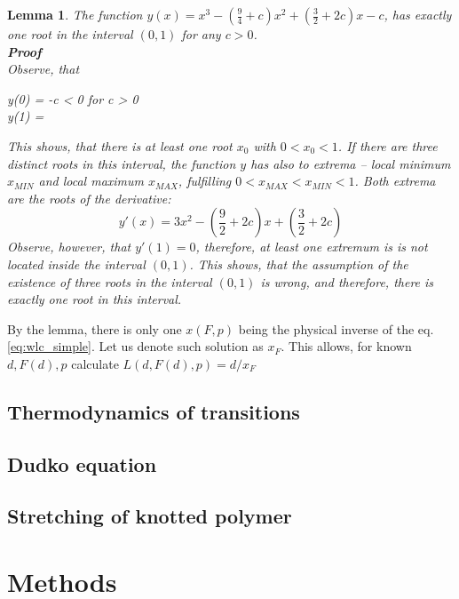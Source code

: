 \documentclass[11pt]{article}
\newtheorem{lemma}[theorem]{Lemma}
\begin{document}
\begin{lemma}
    The function $y(x) = x^3 - (\frac{9}{4}+c) x^2 + (\frac{3}{2}+2c) x - c$, has exactly one root in the interval $(0,1)$ for any $c \gt 0$.
    \\\textbf{Proof}\\
    Observe, that
    \begin{multiline}
        y(0) = -c < 0 for c > 0\\
        y(1) = 
    \end{multiline}
    This shows, that there is at least one root $x_0$ with $0 \lt x_0 \lt 1$.
    If there are three distinct roots in this interval, the function $y$ has also to extrema -- local minimum $x_{MIN}$ and local maximum $x_{MAX}$, fulfilling $0 \lt x_{MAX} \lt x_{MIN} \lt 1$.
    Both extrema are the roots of the derivative:
    \begin{equation}
        y'(x) = 3x^2 - (\frac{9}{2}+2c)x + (\frac{3}{2}+2c)
    \end{equation}
    Observe, however, that $y'(1)=0$, therefore, at least one extremum is is not located inside the interval $(0,1)$.
    This shows, that the assumption of the existence of three roots in the interval $(0,1)$ is wrong, and therefore, there is exactly one root in this interval.
\end{lemma}

By the lemma, there is only one $x(F,p)$ being the physical inverse of the eq.\ref{eq:wlc_simple}.
Let us denote such solution as $x_F$.
This allows, for known $d,F(d),p$ calculate $L(d,F(d),p)=d/x_F$

\subsection{Thermodynamics of transitions}
\label{subsec:thermodynamics}

\subsection{Dudko equation}
\label{subsec:dudko}

\subsection{Stretching of knotted polymer}
\label{subsec:knotted}

\section{Methods}
\label{sec:methods}
\end{document}
